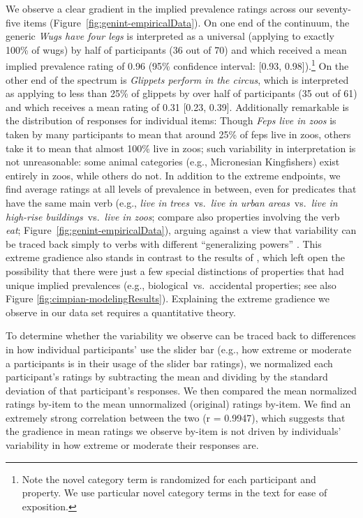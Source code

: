 \documentclass[floatsintext,doc]{apa6}
\let\rmarkdownfootnote\footnote%
\def\footnote{\protect\rmarkdownfootnote}
\newcommand{\ndg}[1]{{\textcolor{Green}{[ndg: #1]}}}
\begin{document}
We observe a clear gradient in the implied prevalence ratings across our seventy-five items (Figure~\ref{fig:genint-empiricalData}).
On one end of the continuum, the generic \emph{Wugs have four legs} is interpreted as a universal (applying to exactly 100\% of wugs) by half of participants (36 out of 70) and which received a mean implied prevalence rating of 0.96 (95\% confidence interval: [0.93, 0.98]).\footnote{Note the novel category term is randomized for each participant and property. We use particular novel category terms in the text for ease of exposition.}
On the other end of the spectrum is \emph{Glippets perform in the circus}, which is interpreted as applying to less than 25\% of glippets by over half of participants (35 out of 61) and which receives a mean rating of 0.31 [0.23, 0.39].
Additionally remarkable is the distribution of responses for individual items: Though \emph{Feps live in zoos} is taken by many participants to mean that around 25\% of feps live in zoos, others take it to mean that almost 100\% live in zoos; such variability in interpretation is not unreasonable: some animal categories (e.g., Micronesian Kingfishers) exist entirely in zoos, while others do not.
In addition to the extreme endpoints, we find average ratings at all levels of prevalence in between, even for predicates that have the same main verb (e.g., \emph{live in} \emph{trees}~vs.~\emph{live in urban areas}~vs.~\emph{live in high-rise buildings}~vs.~\emph{live in zoos}; compare also properties involving the verb \emph{eat}; Figure~\ref{fig:genint-empiricalData}), arguing against a view that variability can be traced back simply to verbs with different ``generalizing powers'' \cite{Abelson1966, Cimpian2010}.
This extreme gradience also stands in contrast to the results of , which left open the possibility that there were just a few special distinctions of properties that had unique implied prevalences (e.g., biological~vs.~accidental properties; see also Figure \ref{fig:cimpian-modelingResults}). 
Explaining the extreme gradience we observe in our data set requires a quantitative theory. 


To determine whether the variability we observe can be traced back to differences in how individual participants' use the slider bar (e.g., how extreme or moderate a participants is in their usage of the slider bar ratings), we normalized each participant's ratings by subtracting the mean and dividing by the standard deviation of that participant's responses. We then compared the mean normalized ratings by-item to the mean unnormalized (original) ratings by-item. We find an extremely strong correlation between the two (r = 0.9947), which suggests that the gradience in mean ratings we observe by-item is not driven by individuals’ variability in how extreme or moderate their responses are.
\end{document}
